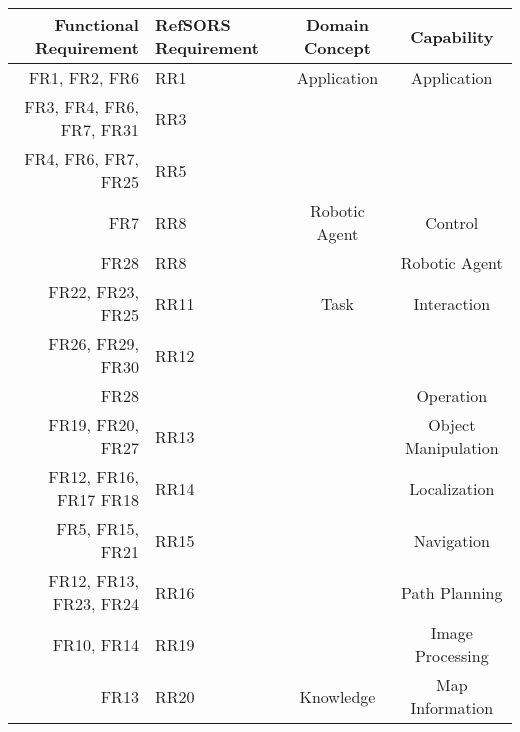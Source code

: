 \begin{table}
	\footnotesize
	\centering
	\begin{tabular}{| r | p{1.8cm} | c | c |}
		\hline
		Functional Requirement & RefSORS Requirement & Domain Concept & Capability \\ 
		\hline
		FR1, FR2, FR6 			& RR1 & Application & Application \\
		FR3, FR4, FR6, FR7, FR31& RR3 & &\\
		FR4, FR6, FR7, FR25 	& RR5 & &\\
		\hline
		FR7 	& RR8 & Robotic Agent & Control \\%
		FR28 	& RR8 & & Robotic Agent \\%
		\hline
		FR22, FR23, FR25 		& RR11 & Task & Interaction \\
		FR26, FR29, FR30 		& RR12 & 	  & \\
		FR28 			 		&      & 	  & Operation \\
		FR19, FR20, FR27 		& RR13 & 	  & Object Manipulation\\
		FR12, FR16, FR17 FR18 	& RR14 & 	  & Localization\\
		FR5, FR15, FR21 		& RR15 & 	  & Navigation\\
		FR12, FR13, FR23, FR24 	& RR16 & 	  & Path Planning\\
		FR10, FR14 				& RR19 & 	  & Image Processing \\ %
		\hline
		FR13 & RR20 & Knowledge & Map Information \\

\end{tabular}
\end{table}

